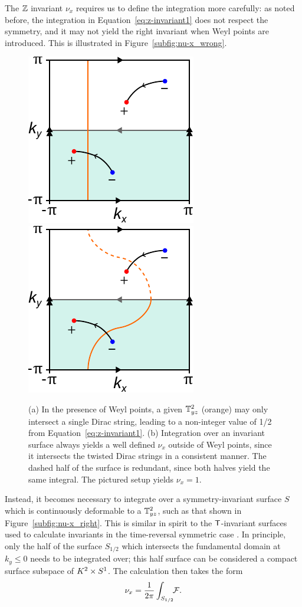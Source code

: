 The $\mathbb{Z}$ invariant $\nu_x$ requires us to define the integration more carefully: as noted before, the integration in Equation~\eqref{eq:z-invariant1} does not respect the symmetry, and it may not yield the right invariant when Weyl points are introduced. This is illustrated in Figure~\ref{subfig:nu-x_wrong}.
\begin{figure}[htb!]
	\centering
	\subcaptionbox{\label{subfig:nu-x_wrong}} {\includegraphics[width=.3\textwidth]{Images/nu-x_wrong}}
	\hfil
	\subcaptionbox{\label{subfig:nu-x_right}} {\includegraphics[width=.3\textwidth]{Images/nu-x_right}}
	\caption{(a) In the presence of Weyl points, a given $\mathbb{T}_{yz}^2$ (orange) may only intersect a single Dirac string, leading to a non-integer value of 1/2 from Equation~\eqref{eq:z-invariant1}. (b) Integration over an invariant surface always yields a well defined $\nu_x$ outside of Weyl points, since it intersects the twisted Dirac strings in a consistent manner. The dashed half of the surface is redundant, since both halves yield the same integral. The pictured setup yields $\nu_x=1$.}
	\label{fig:nu-x}
\end{figure}
Instead, it becomes necessary to integrate over a symmetry-invariant surface $S$ which is continuously deformable to a $\mathbb{T}_{yz}^2$, such as that shown in Figure~\ref{subfig:nu-x_right}. This is similar in spirit to the $\mathsf{T}$-invariant surfaces used to calculate invariants in the time-reversal symmetric case \cite{Thiang_equivariant}. In principle, only the half of the surface $S_{1/2}$ which intersects the fundamental domain at $k_y\leq 0$ needs to be integrated over; this half surface can be considered a compact surface subspace of $K^2\times S^1$. The calculation then takes the form
\begin{equation}\label{eq:z-invariant2}
	\nu_x = \frac{1}{2\pi}\int_{S_{1/2}}\!\!\mathcal{F}.
\end{equation}
